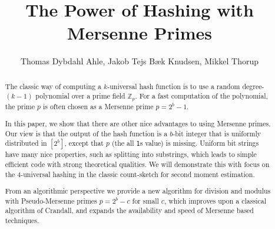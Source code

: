 

\title{The Power of Hashing with Mersenne Primes}
\author{Thomas Dybdahl Ahle, Jakob Tejs Bæk Knudsen, Mikkel Thorup}


\maketitle

\begin{abstract}
The classic way of computing a $k$-universal hash function is to use a random degree-$(k-1)$ polynomial over a prime field $\mathbb Z_p$.
For a fast computation of the polynomial, the prime $p$ is often chosen as a Mersenne prime $p=2^b-1$.

In this paper, we show that there are other nice advantages to using Mersenne primes.
Our view is that the output of the hash function is a $b$-bit integer that is uniformly distributed in $[2^b]$, except that $p$ (the all \texttt1s value) is missing.
Uniform bit strings have many nice properties, such as splitting into substrings, which
leads to simple efficient code with strong theoretical qualities.
We will demonstrate this with focus on the 4-universal hashing in the classic count-sketch for second moment estimation.

From an algorithmic perspective we provide a new algorithm for division and modulus with Pseudo-Mersenne primes
$p=2^b-c$ for small $c$,
which improves upon a classical algorithm of Crandall, and 
expands the availability and speed of Mersenne based techniques.
\end{abstract}

\tableofcontents







% 











